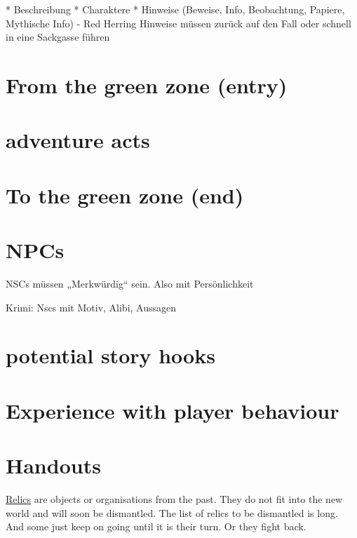 * Beschreibung
* Charaktere
* Hinweise (Beweise, Info, Beobachtung, Papiere, Mythische Info) - Red Herring Hinweise müssen zurück auf den Fall oder schnell in eine Sackgasse führen


\section{From the green zone (entry)}

\section{adventure acts}

\section{To the green zone (end)}

\section{NPCs}

NSCs müssen „Merkwürdig“ sein. Also mit Persönlichkeit

Krimi: Nscs mit Motiv, Alibi, Aussagen


\section{potential story hooks}

\section{Experience with player behaviour}

\section{Handouts}



\begin{sidebarBox}[title=Relics]
\hyperref[sec:Relic]{Relics} are objects or organisations from the past. They do not fit into the new world and will soon be dismantled. The list of relics to be dismantled is long. And some just keep on going until it is their turn. Or they fight back.
\end{sidebarBox}

